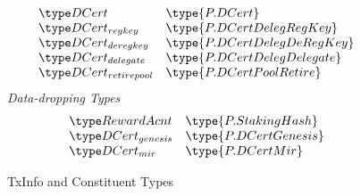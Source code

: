 \begin{figure*}[htb]
\begin{equation*}
\begin{array}{l@{~~~}l}
      \DCert & \type{P.DCert} \\
      \DCertRegKey & \type{P.DCertDelegRegKey} \\
      \DCertDeRegKey & \type{P.DCertDelegDeRegKey} \\
      \DCertDeleg & \type{P.DCertDelegDelegate} \\
      \DCertRetirePool & \type{P.DCertPoolRetire} \\
    \end{array}
  \end{equation*}
  \emph{Data-dropping Types} \\
  \begin{equation*}
    \begin{array}{l@{~~~}l}
      \RewardAcnt & \type{P.StakingHash} \\
      \DCertGen & \type{P.DCertGenesis} \\
      \DCertMir & \type{P.DCertMir} \\
    \end{array}
  \end{equation*}
  \caption{TxInfo and Constituent Types}
  \label{fig:txinfo-types}
\end{figure*}

